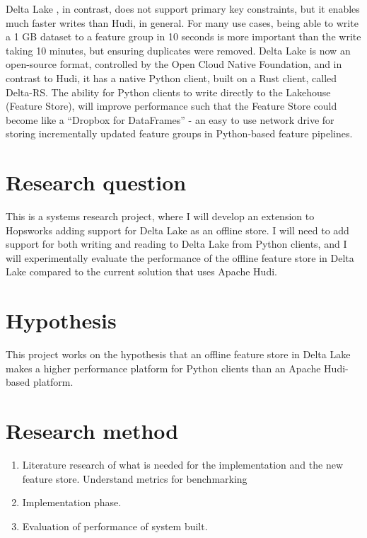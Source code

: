 \documentclass[12pt,twoside,english]{article}
\begin{document}
Delta Lake \cite{deltalake2020}, in contrast, does not support primary key constraints, but it enables much faster writes than Hudi, in general. For many use cases, being able to write a 1 GB dataset to a feature group in 10 seconds is more important than the write taking 10 minutes, but ensuring duplicates were removed. Delta Lake is now an open-source format, controlled by the Open Cloud Native Foundation, and in contrast to Hudi, it has a native Python client, built on a Rust client, called Delta-RS. The ability for Python clients to write directly to the Lakehouse (Feature Store), will improve performance such that the Feature Store could become like a “Dropbox for DataFrames” - an easy to use network drive for storing incrementally updated feature groups in Python-based feature pipelines.

\section{Research question}

This is a systems research project, where I will develop an extension to Hopsworks adding support for Delta Lake as an offline store. I will need to add support for both writing and reading to Delta Lake from Python clients, and I will experimentally evaluate the performance of the offline feature store in Delta Lake compared to the current solution that uses Apache Hudi.

\section{Hypothesis}

This project works on the hypothesis that an offline feature store in Delta Lake makes a higher performance platform for Python clients than an Apache Hudi-based platform.

\section{Research method}
\begin{enumerate}
    \item Literature research of what is needed for the implementation and the new feature store. Understand metrics for benchmarking
    \item Implementation phase.
    \item Evaluation of performance of system built.
\end{enumerate}
\end{document}

